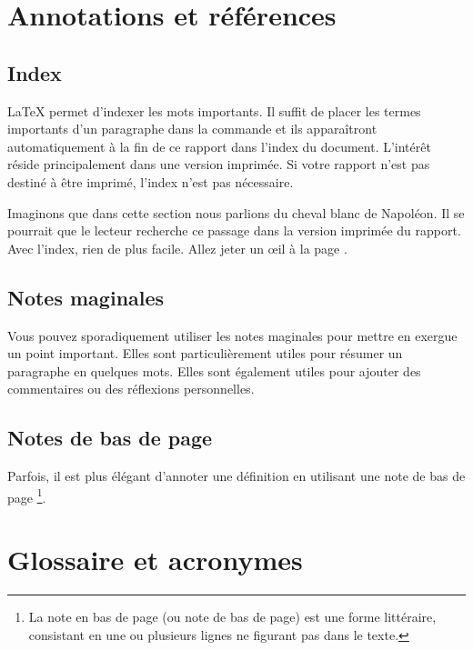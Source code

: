 \section{Annotations et références}

\subsection{Index}
\LaTeX{} permet d'indexer les mots  importants. Il suffit de placer les termes importants d'un paragraphe dans la commande \texttt{} et ils apparaîtront automatiquement à la fin de ce rapport dans l'index du document. L'intérêt réside principalement dans une version imprimée. Si votre rapport n'est pas destiné à être imprimé, l'index n'est pas nécessaire.


Imaginons que dans cette section nous parlions du cheval blanc  de Napoléon. Il se pourrait que le lecteur recherche ce passage dans la version imprimée du rapport. Avec l'index, rien de plus facile. Allez jeter un œil à la page \pageref{index}.

\subsection{Notes maginales}

 Vous pouvez sporadiquement utiliser les notes maginales pour mettre en exergue un point important. Elles sont particulièrement utiles pour résumer un paragraphe en quelques mots. Elles sont également utiles pour ajouter des commentaires ou des réflexions personnelles.

\subsection{Notes de bas de page}

Parfois, il est plus élégant d'annoter une définition en utilisant une note de bas de page \footnote{La note en bas de page (ou note de bas de page) est une forme littéraire, consistant en une ou plusieurs lignes ne figurant pas dans le texte.}.

\section{Glossaire et acronymes}

